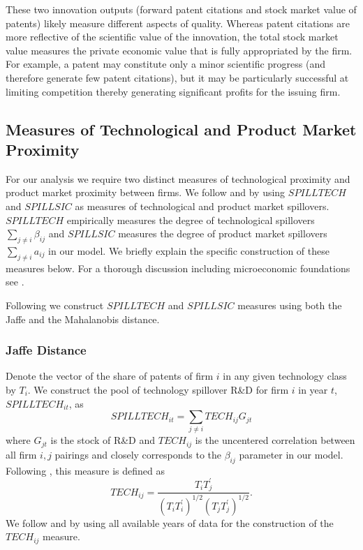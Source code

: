 \documentclass[12pt]{article}
\begin{document}
These two innovation outputs (forward patent citations and stock market value of patents) likely measure different aspects of quality. Whereas patent citations are more reflective of the scientific value of the innovation, the total stock market value measures the private economic value that is fully appropriated by the firm. For example, a patent may constitute only a minor scientific progress (and therefore generate few patent citations), but it may be particularly successful at limiting competition thereby generating significant profits for the issuing firm. 



\subsection{Measures of Technological and Product Market Proximity}

For our analysis we require two distinct measures of technological proximity and product market proximity between firms. We follow \citet{bloom2013} and \cite{lucking2018spillovers} by using $\mathit{SPILLTECH}$ and $\mathit{SPILLSIC}$ as measures of technological and product market spillovers. $\mathit{SPILLTECH}$ empirically measures the degree of technological spillovers $\sum_{j \neq i} \beta_{ij}$ and $\mathit{SPILLSIC}$ measures the degree of product market spillovers $\sum_{j \neq i} a_{ij}$ in our model. We briefly explain the specific construction of these measures below. For a thorough discussion including microeconomic foundations see \cite{bloom2013}. 

Following \cite{bloom2013} we construct $\mathit{SPILLTECH}$ and $\mathit{SPILLSIC}$ measures using both the Jaffe and the Mahalanobis distance.

\subsubsection{Jaffe Distance}

Denote the vector of the share of patents of firm $i$ in any given technology class by $T_i$. We construct the pool of technology spillover R\&D for firm $i$ in year $t$, $\mathit{SPILLTECH}_{it}$, as
\begin{equation}
\mathit{SPILLTECH}_{it} = \sum_{j \neq i} \mathit{TECH}_{ij} G_{jt}
\end{equation}
where $G_{jt}$ is the stock of R\&D and $\mathit{TECH}_{ij}$ is the uncentered correlation between all firm $i,j$ pairings and closely corresponds to the $\beta_{ij}$ parameter in our model. Following \cite{jaffe1988}, this measure is defined as
\begin{equation}
\mathit{TECH}_{ij} = \frac{T_{i} T^{'}_{j}}{(T_{i} T^{'}_{i})^{1/2} (T_{j} T^{'}_{j})^{1/2}}.
\end{equation}
We follow \cite{bloom2013} and \cite{lucking2018spillovers} by using all available years of data for the construction of the $\mathit{TECH}_{ij}$ measure.
\end{document}
